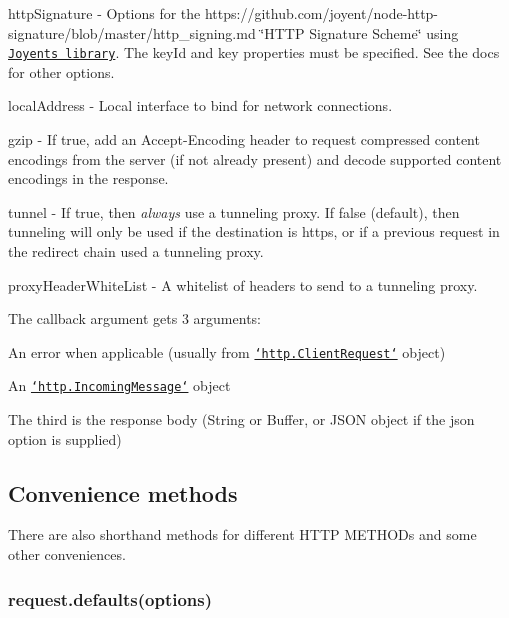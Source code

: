\begin{DoxyItemize}
$$\item {\ttfamily http\+Signature} -\/ Options for the https\+://github.com/joyent/node-\/http-\/signature/blob/master/http\+\_\+signing.\+md \char`\"{}\+H\+T\+T\+P Signature Scheme\char`\"{} using \href{https://github.com/joyent/node-http-signature}{\tt Joyent\textquotesingle{}s library}. The {\ttfamily key\+Id} and {\ttfamily key} properties must be specified. See the docs for other options.
\item {\ttfamily local\+Address} -\/ Local interface to bind for network connections.
\item {\ttfamily gzip} -\/ If {\ttfamily true}, add an {\ttfamily Accept-\/\+Encoding} header to request compressed content encodings from the server (if not already present) and decode supported content encodings in the response.
\item {\ttfamily tunnel} -\/ If {\ttfamily true}, then {\itshape always} use a tunneling proxy. If {\ttfamily false} (default), then tunneling will only be used if the destination is {\ttfamily https}, or if a previous request in the redirect chain used a tunneling proxy.
\item {\ttfamily proxy\+Header\+White\+List} -\/ A whitelist of headers to send to a tunneling proxy.
\end{DoxyItemize}

The callback argument gets 3 arguments\+:


\begin{DoxyEnumerate}
\item An {\ttfamily error} when applicable (usually from \href{http://nodejs.org/api/http.html#http_class_http_clientrequest}{\tt `http.Client\+Request`} object)
\item An \href{http://nodejs.org/api/http.html#http_http_incomingmessage}{\tt `http.Incoming\+Message`} object
\item The third is the {\ttfamily response} body ({\ttfamily String} or {\ttfamily Buffer}, or J\+S\+O\+N object if the {\ttfamily json} option is supplied)
\end{DoxyEnumerate}

\subsection*{Convenience methods}

There are also shorthand methods for different H\+T\+T\+P M\+E\+T\+H\+O\+Ds and some other conveniences.

\subsubsection*{request.\+defaults(options)}

